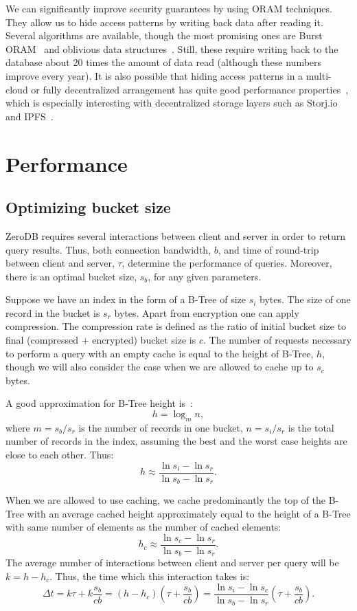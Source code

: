 \documentclass[notitlepage,longbibliography]{revtex4-1}
\begin{document}
We can significantly improve security guarantees by using ORAM techniques.
They allow us to hide access patterns by writing back data after reading it.
Several algorithms are available, though the most promising ones are Burst ORAM~\cite{burst-oram}
and oblivious data structures~\cite{ods-wang-2014}.
Still, these require writing back to the database about 20 times the amount of data read
(although these numbers improve every year).
It is also possible that hiding access patterns in a multi-cloud or fully decentralized arrangement has quite good performance properties~\cite{oram-multicloud},
which is especially interesting with decentralized storage layers such as Storj.io~\cite{storj} and IPFS~\cite{ipfs}.

\section{Performance}

\subsection{Optimizing bucket size}


ZeroDB requires several interactions between client and server in order to return query results.
Thus, both connection bandwidth, $b$, and time of round-trip between client and server, $\tau$, determine the performance of queries.
Moreover, there is an optimal bucket size, $s_b$, for any given parameters.

Suppose we have an index in the form of a B-Tree of size $s_i$ bytes.
The size of one record in the bucket is $s_r$ bytes.
Apart from encryption one can apply compression.
The compression rate is defined as the ratio of initial bucket size to final (compressed + encrypted) bucket size is $c$.
The number of requests necessary to perform a query with an empty cache is equal to the height of B-Tree, $h$, though we will also consider the case when we are allowed to cache up to $s_c$ bytes.


A good approximation for B-Tree height is~\cite{wiki:b-tree}:
$$h = \log_m n,$$
where $m = s_b/s_r$ is the number of records in one bucket,
$n = s_i/s_r$ is the total number of records in the index,
assuming the best and the worst case heights are close to each other.
Thus:
$$h \approx \frac{\ln s_i - \ln s_r}{\ln s_b - \ln s_r}.$$

When we are allowed to use caching, we cache predominantly the top of the B-Tree with an average cached height approximately equal to the height of a B-Tree with same number of elements as the number of cached elements:
$$h_c \approx \frac{\ln s_c - \ln s_r}{\ln s_b - \ln s_r}.$$
The average number of interactions between client and server per query will be $k = h - h_c$.
Thus, the time which this interaction takes is:
$$\Delta t = k\tau + k\frac{s_b}{cb} =
\left(h - h_c \right) \left( \tau + \frac{s_b}{cb} \right) =
\frac{\ln s_i - \ln s_c}{\ln s_b - \ln s_r} \left( \tau + \frac{s_b}{cb} \right).$$
\end{document}
